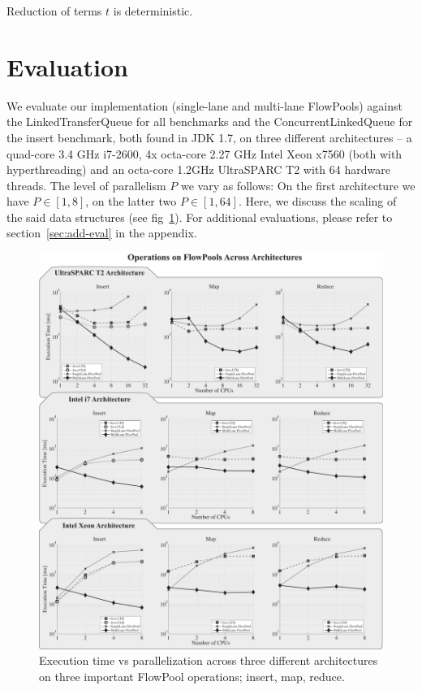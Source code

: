 \documentclass[runningheads,a4paper]{llncs}
\begin{document}
\begin{theorem}
Reduction of terms $t$ is deterministic.
\end{theorem}


\section{Evaluation}
\label{sec:evaluation}

We evaluate our implementation (single-lane and multi-lane
FlowPools) against the LinkedTransferQueue \cite{SchererLS09} for all
benchmarks and the ConcurrentLinkedQueue \cite{Michael96} for the
insert benchmark, both found in JDK 1.7, on three different
architectures -- a quad-core 3.4 GHz i7-2600, 4x octa-core 2.27 GHz
Intel Xeon x7560 (both with hyperthreading) and an octa-core 1.2GHz
UltraSPARC T2 with 64 hardware threads. The level of parallelism $P$
we vary as follows: On the first architecture we have $P \in [1, 8]$,
on the latter two $P \in [1,64]$. Here, we discuss the scaling of the
said data structures (see fig~\ref{fig:eval-cpu-scaling}). For
additional evaluations, please refer to section~\ref{sec:add-eval} in
the appendix.

\begin{figure}[ht!]
\centering
\includegraphics[width=\textwidth]{../benchmarks/graphs/scaling-operations}
\setlength{\abovecaptionskip}{-10pt}
\setlength{\belowcaptionskip}{-20pt}
\caption{Execution time vs parallelization across three different
architectures on three important FlowPool operations; insert, map, 
reduce.}
\label{fig:eval-cpu-scaling}
\end{figure}
\end{document}
